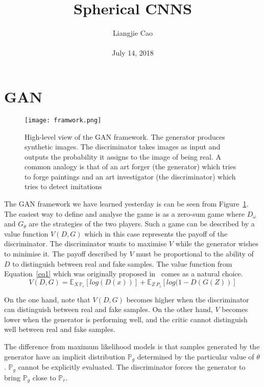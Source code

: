 \documentclass[10pt,twocolumn,letterpaper]{article}
\begin{document}
\title{\textbf{Spherical CNNS
}}
\author{Liangjie Cao\\\\ July 14, 2018}
\maketitle
\section{GAN}
  \begin{figure}[!htb]
  	\centering
  	\texttt{[image: framwork.png]}\\
  	\caption{High-level view of the GAN framework. The generator produces synthetic images. The
  		discriminator takes images as input and outputs the probability it assigns to the image of being
  		real. A common analogy is that of an art forger (the generator) which tries to forge paintings and
  		an art investigator (the discriminator) which tries to detect imitations}\label{Figure2} 
  \end{figure}
The GAN framework we have learned yesterday is can be seen from Figure~\ref{Figure2}. The easiest way to define and analyse the game is as a zero-sum game where $D_\omega$ and
$G_\theta$ are the strategies of the two players. Such a game can be described by a value function
$V (D, G)$ which in this case represents the payoff of the discriminator. The discriminator
wants to maximise $V$ while the generator wishes to minimise it. The payoff described by
$V$ must be proportional to the ability of $D$ to distinguish between real and fake samples. The value function from Equation~\ref{eq1} which was originally proposed in~\cite{name5} comes as a
natural choice.
\begin{equation}
V(D,G)=\mathbb{E}_{X~\mathbb{P}_r}[log(D(x))]+\mathbb{E}_{Z~P_z}[log(1-D(G(Z))]
\label{eq1}
\end{equation}
\par On the one hand, note that $V (D, G)$ becomes higher when the discriminator can distinguish between real and fake samples. On the other hand, $V$ becomes lower when the
generator is performing well, and the critic cannot distinguish well between real and fake samples.
\par The difference from maximum likelihood models is that samples generated by the generator have an implicit distribution $\mathbb{P}_g$ determined by the particular value of $\theta$. $\mathbb{P}_g$ cannot be explicitly evaluated. The discriminator forces the generator to bring $\mathbb{P}_g$ close to $\mathbb{P}_r$.
\end{document}
